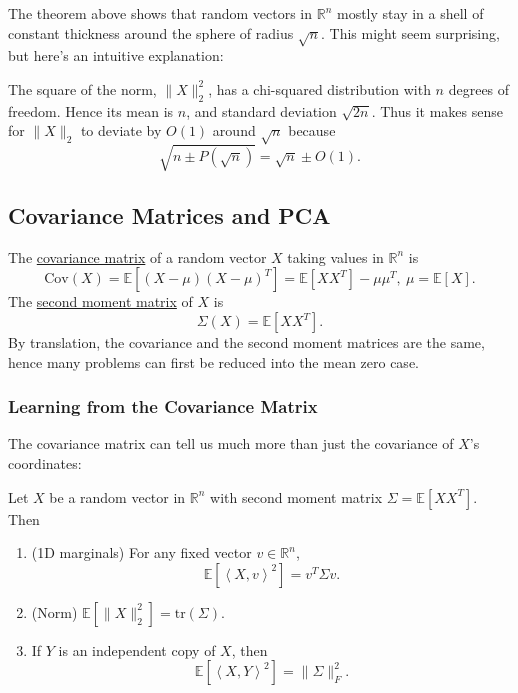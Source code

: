 \begin{remark}
\label{rmk:3.1.2}
The theorem above shows that random vectors in $\mathbb{R}^n$ mostly stay in a shell of constant thickness 
around the sphere of radius $\sqrt{n}$. This might seem surprising, but here's an intuitive explanation: 

The square of the norm, $\lVert X \rVert_{2}^2$, has a chi-squared distribution with $n$ degrees of freedom. 
Hence its mean is $n$, and standard deviation $\sqrt{2n}$. Thus it makes sense for $\lVert X \rVert_{2}$ 
to deviate by $O(1)$ around $\sqrt{n}$ because 
\[ \sqrt{n \pm P(\sqrt{n})} = \sqrt{n} \pm O(1). \]
\end{remark}


\subsection{Covariance Matrices and PCA}
\begin{definition}[]
\label{def:3.2.1}
The \underline{covariance matrix} of a random vector $X$ taking values in $\mathbb{R}^n$ is 
\[ \mathrm{Cov}(X) = \mathbb{E}[(X - \mu)(X - \mu)^T] = \mathbb{E}[XX^T] - \mu \mu^T, \ \mu = \mathbb{E}[X]. \]
The \underline{second moment matrix} of $X$ is
\[ \Sigma(X) = \mathbb{E}[XX^T]. \]
By translation, the covariance and the second moment matrices are the same, hence many problems can first 
be reduced into the mean zero case.
\end{definition}

\subsubsection{Learning from the Covariance Matrix}
The covariance matrix can tell us much more than just the covariance of $X$'s coordinates: 
\begin{proposition}[]
\label{prop:3.2.2}
Let $X$ be a random vector in $\mathbb{R}^n$ with second moment matrix $\Sigma = \mathbb{E}[XX^T]$. Then 
\begin{enumerate}
	\item (1D marginals) For any fixed vector $v \in \mathbb{R}^n$, 
	\[ \mathbb{E}[\left\langle X, v \right\rangle^2] = v^T \Sigma v. \]
	\item (Norm) $\mathbb{E}[\lVert X \rVert_{2}^2] = \mathrm{tr}(\Sigma).$
	\item If $Y$ is an independent copy of $X$, then 
	\[ \mathbb{E}[\left\langle X, Y \right\rangle^2] = \lVert \Sigma \rVert_{F}^2. \]
\end{enumerate}
\end{proposition}

